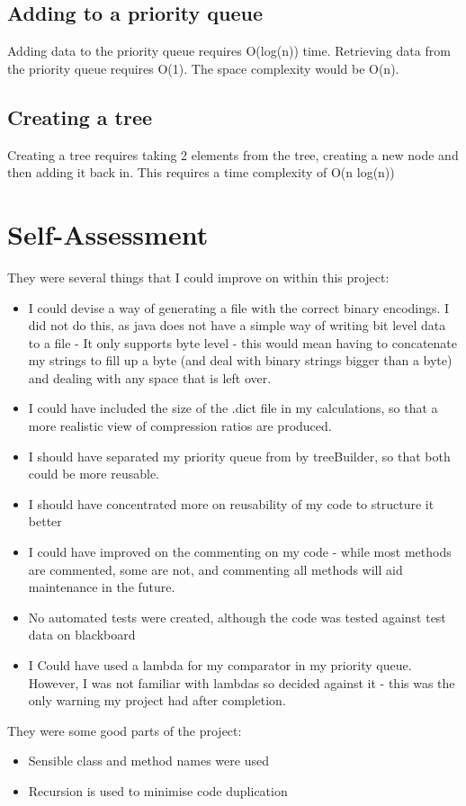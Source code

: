 \documentclass[11pt, oneside]{amsart}
\begin{document}
	\subsection{Adding to a priority queue}
		Adding data to the priority queue requires O(log(n)) time. Retrieving data from the priority queue requires O(1). The space complexity would be O(n).
	\subsection{Creating a tree}
		Creating a tree requires taking 2 elements from the tree, creating a new node and then adding it back in. This requires a time complexity of O(n log(n))
\section{Self-Assessment}
	They were several things that I could improve on within this project:
	\begin{itemize}
		\item I could devise a way of generating a file with the correct binary encodings. I did not do this, as java does not have a simple way of writing bit level data to a file - It only supports byte level - this would mean having to concatenate my strings to fill up a byte (and deal with binary strings bigger than a byte) and dealing with any space that is left over.
		\item I could have included the size of the .dict file in my calculations, so that a more realistic view of compression ratios are produced.
		\item I should have separated my priority queue from by treeBuilder, so that both could be more reusable.
		\item I should have concentrated more on reusability of my code to structure it better
		\item I could have improved on the commenting on my code - while most methods are commented, some are not, and commenting all methods will aid maintenance in the future.
		\item No automated tests were created, although the code was tested against test data on blackboard
		\item I Could have used a lambda for my comparator in my priority queue. However, I was not familiar with lambdas so decided against it - this was the only warning my project had after completion.
	\end{itemize}
	They were some good parts of the project:
	\begin{itemize}
		\item Sensible class and method names were used
		\item Recursion is used to minimise code duplication
	\end{itemize}
\end{document}
